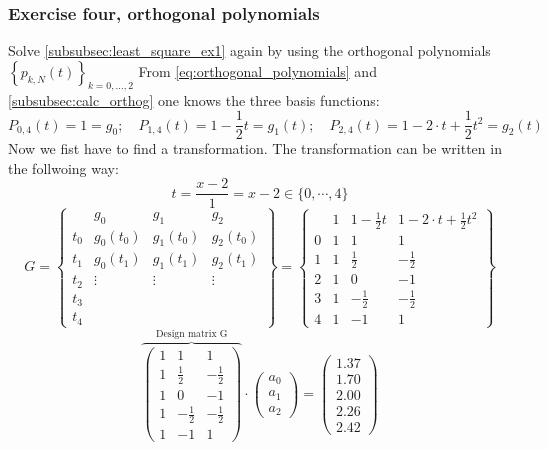 \subsubsection{Exercise four, orthogonal polynomials}\label{subsubsec:orthognal_example}
Solve \autoref{subsubsec:least_square_ex1} again by using the orthogonal polynomials $\left\{p_{k, N}(t)\right\}_{k=0, \ldots, 2}$\newline
From \autoref{eq:orthogonal_polynomials} and \autoref{subsubsec:calc_orthog} one knows the three basis functions:
$$
P_{0,4}(t)=1=g_0 ; \quad P_{1,4}(t)=1-\frac{1}{2}t=g_1(t) ; \quad P_{2,4}(t)=1-2\cdot t +\frac{1}{2}t^2=g_2(t)
$$
Now we fist have to find a transformation. The transformation can be written in  the follwoing way:
$$
t=\frac{x-2}{1}=x-2 \in\{0, \cdots, 4\}
$$
$$
G=
\left\{\begin{array}{c|ccc}
 & g_0 & g_1 & g_2 \\
\hline 
t_0 & g_0\left(t_0\right) & g_1\left(t_0\right) & g_2\left(t_0\right) \\
t_1 & g_0\left(t_1\right) & g_1\left(t_1\right) & g_2\left(t_1\right)\\
t_2 &\vdots&\vdots&\vdots \\
t_3 &  \\
t_4 &  
\end{array}\right\}
=
\left\{\begin{array}{c|ccc}
 & 1 & 1-\frac{1}{2}t & 1-2\cdot t +\frac{1}{2}t^2 \\
\hline 
0 & 1 & 1 & 1 \\
1 & 1 & \frac{1}{2} & -\frac{1}{2} \\
2 & 1 & 0 & -1 \\
3 & 1 & -\frac{1}{2} & -\frac{1}{2} \\
4 & 1 & -1 & 1 
\end{array}\right\}
$$
\begin{equation}
\overbrace{\left(\begin{array}{ccc}
1 & 1 & 1 \\
1 & \frac{1}{2} & -\frac{1}{2} \\
1 & 0 & -1 \\
1 & -\frac{1}{2} & -\frac{1}{2} \\
1 & -1 & 1 
\end{array}\right)}^{\text{Design matrix G}} \cdot\left(\begin{array}{l}
a_0 \\
a_1 \\
a_2
\end{array}\right)=\left(\begin{array}{l}
1.37 \\
1.70 \\
2.00 \\
2.26 \\
2.42 
\end{array}\right)
\end{equation}
